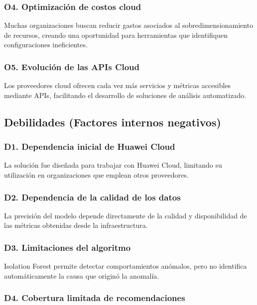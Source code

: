 \subsubsection*{O4. Optimización de costos cloud}

Muchas organizaciones buscan reducir gastos asociados al sobredimensionamiento de recursos, creando una oportunidad para herramientas que identifiquen configuraciones ineficientes.

\subsubsection*{O5. Evolución de las APIs Cloud}

Los proveedores cloud ofrecen cada vez más servicios y métricas accesibles mediante APIs, facilitando el desarrollo de soluciones de análisis automatizado.

\subsection{Debilidades (Factores internos negativos)}

\subsubsection*{D1. Dependencia inicial de Huawei Cloud}

La solución fue diseñada para trabajar con Huawei Cloud, limitando su utilización en organizaciones que emplean otros proveedores.

\subsubsection*{D2. Dependencia de la calidad de los datos}

La precisión del modelo depende directamente de la calidad y disponibilidad de las métricas obtenidas desde la infraestructura.

\subsubsection*{D3. Limitaciones del algoritmo}

Isolation Forest permite detectar comportamientos anómalos, pero no identifica automáticamente la causa que originó la anomalía.

\subsubsection*{D4. Cobertura limitada de recomendaciones}

